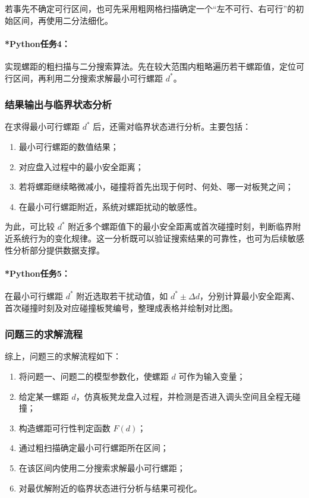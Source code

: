 \documentclass[12pt,a4paper]{ctexart}
\begin{document}
若事先不确定可行区间，也可先采用粗网格扫描确定一个“左不可行、右可行”的初始区间，再使用二分法细化。

\paragraph{*Python任务4：}
实现螺距的粗扫描与二分搜索算法。先在较大范围内粗略遍历若干螺距值，定位可行区间，再利用二分搜索求解最小可行螺距 $d^\ast$。

\subsubsection{结果输出与临界状态分析}
在求得最小可行螺距 $d^\ast$ 后，还需对临界状态进行分析。主要包括：

\begin{enumerate}
    \item 最小可行螺距的数值结果；
    \item 对应盘入过程中的最小安全距离；
    \item 若将螺距继续略微减小，碰撞将首先出现于何时、何处、哪一对板凳之间；
    \item 在最小可行螺距附近，系统对螺距扰动的敏感性。
\end{enumerate}

为此，可比较 $d^\ast$ 附近多个螺距值下的最小安全距离或首次碰撞时刻，判断临界附近系统行为的变化规律。这一分析既可以验证搜索结果的可靠性，也可为后续敏感性分析部分提供数据支撑。

\paragraph{*Python任务5：}
在最小可行螺距 $d^\ast$ 附近选取若干扰动值，如 $d^\ast\pm \Delta d$，分别计算最小安全距离、首次碰撞时刻及对应碰撞板凳编号，整理成表格并绘制对比图。

\subsubsection{问题三的求解流程}
综上，问题三的求解流程如下：

\begin{enumerate}
    \item 将问题一、问题二的模型参数化，使螺距 $d$ 可作为输入变量；
    \item 给定某一螺距 $d$，仿真板凳龙盘入过程，并检测是否进入调头空间且全程无碰撞；
    \item 构造螺距可行性判定函数 $F(d)$；
    \item 通过粗扫描确定最小可行螺距所在区间；
    \item 在该区间内使用二分搜索求解最小可行螺距；
    \item 对最优解附近的临界状态进行分析与结果可视化。
\end{enumerate}
\end{document}
